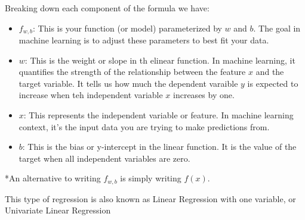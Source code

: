 \documentclass[a4paper]{article}
\begin{document}
    Breaking down each component of the formula we have: 

    \begin{itemize}
        \item \(f_{w,b}\): This is your function (or model) parameterized by \(w\) and \(b\). The goal in machine learning is to adjust these parameters to best fit your data. 
        \item \(w\): This is the weight or slope in th elinear function. In machine learning, it quantifies the strength of the relationship between the feature \(x\) and the target variable. It tells us how much the dependent varaible \(y\) is expected to increase when teh independent variable \(x\) increases by one.
        \item \(x\): This represents the independent variable or feature. In machine learning context, it's the input data you are trying to make predictions from.
        \item \(b\): This is the bias or y-intercept in the linear function. It is the value of the target when all independent variables are zero. 
    \end{itemize}

    *An alternative to writing \(f_{w,b}\) is simply writing \(f(x)\).

    \begin{center}
        \begin{YStkyNote}[Note]
                This type of regression is also known as Linear Regression with one variable, or Univariate Linear Regression
        \end{YStkyNote}
    \end{center}


    \begin{center}
    \end{center}
\end{document}
